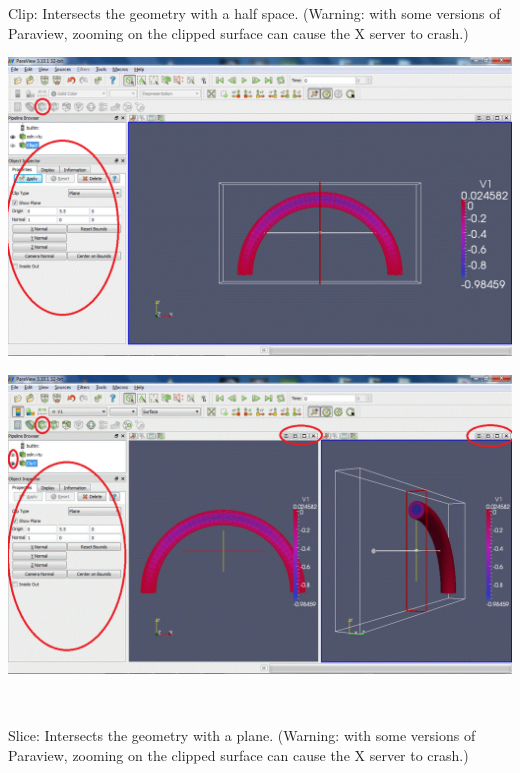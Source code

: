 \begin{DoxyEnumerate}
\item {\ttfamily Clip\+:} Intersects the geometry with a half space. (Warning\+: with some versions of Paraview, zooming on the clipped surface can cause the X server to crash.) ~\newline
 
\begin{DoxyImageNoCaption}
  \mbox{\includegraphics[width=\textwidth]{paraview09}}
\end{DoxyImageNoCaption}
  
\begin{DoxyImageNoCaption}
  \mbox{\includegraphics[width=\textwidth]{paraview091}}
\end{DoxyImageNoCaption}
 ~\newline

\item {\ttfamily Slice\+:} Intersects the geometry with a plane. (Warning\+: with some versions of Paraview, zooming on the clipped surface can cause the X server to crash.) ~\newline
 

\end{DoxyEnumerate}
